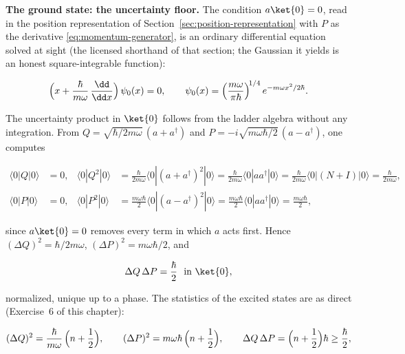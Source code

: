 \textbf{The ground state: the uncertainty floor.} The condition $a\ket{0} = 0$, read in the position representation of Section~\ref{sec:position-representation} with $P$ as the derivative \eqref{eq:momentum-generator}, is an ordinary differential equation solved at sight (the licensed shorthand of that section; the Gaussian it yields is an honest square-integrable function):
\begin{linenomath}
    \begin{equation}
        \Bigl(x + \frac{\hbar}{m\omega}\,\frac{\dd}{\dd x}\Bigr)\,\psi_0(x) = 0,
        \qquad
        \psi_0(x) = \Bigl(\frac{m\omega}{\pi\hbar}\Bigr)^{\!1/4}\,e^{-m\omega x^2/2\hbar}.
        \label{eq:oscillator-ground}
    \end{equation}
\end{linenomath}
The uncertainty product in $\ket{0}$ follows from the ladder algebra without any integration. From $Q=\sqrt{\hbar/2m\omega}\,(a+a^\dagger)$ and $P=-i\sqrt{m\omega\hbar/2}\,(a-a^\dagger)$, one computes
\begin{linenomath}
    \begin{align*}
        \langle 0|Q|0\rangle &= 0, &
        \langle 0|Q^2|0\rangle &= \frac{\hbar}{2m\omega}\langle 0|(a+a^\dagger)^2|0\rangle
        = \frac{\hbar}{2m\omega}\langle 0|aa^\dagger|0\rangle
        = \frac{\hbar}{2m\omega}\langle 0|(N+I)|0\rangle
        = \frac{\hbar}{2m\omega},\\[4pt]
        \langle 0|P|0\rangle &= 0, &
        \langle 0|P^2|0\rangle &= \frac{m\omega\hbar}{2}\langle 0|(a-a^\dagger)^2|0\rangle
        = \frac{m\omega\hbar}{2}\langle 0|aa^\dagger|0\rangle
        = \frac{m\omega\hbar}{2},
    \end{align*}
\end{linenomath}
since $a\ket{0}=0$ removes every term in which $a$ acts first. Hence $(\Delta Q)^2=\hbar/2m\omega$, $(\Delta P)^2=m\omega\hbar/2$, and
\begin{linenomath}
    \begin{equation*}
        \Delta Q\,\Delta P = \frac{\hbar}{2}\ \ \text{in }\ket{0},
    \end{equation*}
\end{linenomath}
normalized, unique up to a phase. The statistics of the excited states are as direct (Exercise~6 of this chapter):
\begin{linenomath}
    \begin{equation}
        (\Delta Q)^2 = \frac{\hbar}{m\omega}\,\Bigl(n + \frac{1}{2}\Bigr),
        \qquad
        (\Delta P)^2 = m\omega\hbar\,\Bigl(n + \frac{1}{2}\Bigr),
        \qquad
        \Delta Q\,\Delta P = \Bigl(n + \frac{1}{2}\Bigr)\hbar \geq \frac{\hbar}{2},
    \end{equation}
\end{linenomath}

